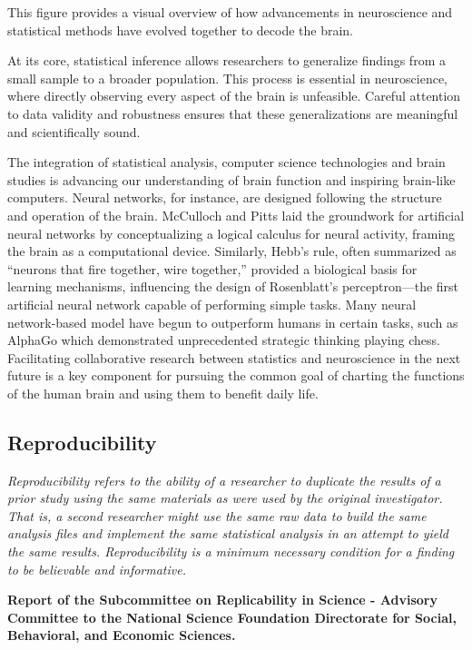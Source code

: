 \documentclass[
]{article}
\begin{document}
This figure provides a visual overview of how advancements in
neuroscience and statistical methods have evolved together to decode the
brain.

At its core, statistical inference allows researchers to generalize
findings from a small sample to a broader population. This process is
essential in neuroscience, where directly observing every aspect of the
brain is unfeasible. Careful attention to data validity and robustness
ensures that these generalizations are meaningful and scientifically
sound.

The integration of statistical analysis, computer science technologies
and brain studies is advancing our understanding of brain function and
inspiring brain-like computers. Neural networks, for instance, are
designed following the structure and operation of the brain. McCulloch
and Pitts laid the groundwork for artificial neural networks by
conceptualizing a logical calculus for neural activity, framing the
brain as a computational device. Similarly, Hebb's rule, often
summarized as ``neurons that fire together, wire together,'' provided a
biological basis for learning mechanisms, influencing the design of
Rosenblatt's perceptron---the first artificial neural network capable of
performing simple tasks. Many neural network-based model have begun to
outperform humans in certain tasks, such as AlphaGo which demonstrated
unprecedented strategic thinking playing chess. Facilitating
collaborative research between statistics and neuroscience in the next
future is a key component for pursuing the common goal of charting the
functions of the human brain and using them to benefit daily life.

\hypertarget{reproducibility}{%
\subsection{Reproducibility}\label{reproducibility}}

\emph{Reproducibility refers to the ability of a researcher to duplicate
the results of a prior study using the same materials as were used by
the original investigator. That is, a second researcher might use the
same raw data to build the same analysis files and implement the same
statistical analysis in an attempt to yield the same results.
Reproducibility is a minimum necessary condition for a finding to be
believable and informative.}

\textbf{Report of the Subcommittee on Replicability in Science -
Advisory Committee to the National Science Foundation Directorate for
Social, Behavioral, and Economic Sciences.}
\end{document}
